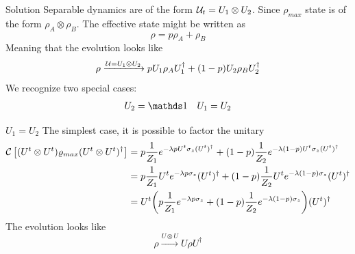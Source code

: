 \begin{frame}{Solution}
    Separable dynamics are of the form $\mathcal{U}_{t}=U_{1}\otimes U_{2}$. Since $\rho_{max}$ state is of the form $\rho_{A}\otimes\rho_{B}$. The effective state might be written as 
    \begin{equation*}
        \rho=p\rho_{A}+\rho_{B}
    \end{equation*}
    Meaning that the evolution looks like
    \begin{equation*}
        \rho\xrightarrow{\mathcal{U}=U_{1}\otimes U_{2}} pU_{1}\rho_{A}U_{1}^{\dag}+(1-p)U_{2}\rho_{B}U_{2}^{\dag}
    \end{equation*}
    We recognize two special cases:
    \begin{align*}
        U_{2}=\Id&&U_{1}=U_{2}
    \end{align*}
\end{frame}

\begin{frame}{$U_{1}=U_{2}$}
    The simplest case, it is possible to factor the unitary
    \begin{align*}
    \mathcal{C}\left[(U^{t}\otimes U^{t})\varrho_{max}(U^{t}\otimes U^{t})^{\dag}\right]&=p\frac{1}{Z_{1}}e^{-\lambda p U^{t}\sigma_{z}(U^t)^{\dag}}+(1-p)\frac{1}{Z_{2}}e^{-\lambda (1-p)U^{t}\sigma_{z}(U^t)^{\dag}}\\
    &=p\frac{1}{Z_{1}}U^{t}e^{-\lambda p \sigma_{z}}(U^t)^{\dag}+(1-p)\frac{1}{Z_{2}}U^{t}e^{-\lambda (1-p)\sigma_{z}}(U^t)^{\dag}\\
    &=U^{t}\qty(p\frac{1}{Z_{1}}e^{-\lambda p \sigma_{z}}+(1-p)\frac{1}{Z_{2}}e^{-\lambda (1-p)\sigma_{z}})(U^t)^{\dag}\\
    \end{align*}
    The evolution looks like
    \begin{equation}
        \rho\xrightarrow{U\otimes U}U\rho U^{\dagger}
    \end{equation}
\end{frame}

